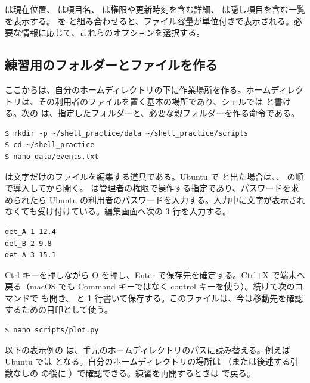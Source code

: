  は現在位置、 は項目名、 は権限や更新時刻を含む詳細、 は隠し項目を含む一覧を表示する。 を  と組み合わせると、ファイル容量が単位付きで表示される。必要な情報に応じて、これらのオプションを選択する。

\subsection{練習用のフォルダーとファイルを作る}

ここからは、自分のホームディレクトリの下に作業場所を作る。ホームディレクトリは、その利用者のファイルを置く基本の場所であり、シェルでは \code{\textasciitilde} と書ける。次の  は、指定したフォルダーと、必要な親フォルダーを作る命令である。

\begin{lstlisting}[numbers=none, xleftmargin=2\zw]
$ mkdir -p ~/shell_practice/data ~/shell_practice/scripts
$ cd ~/shell_practice
$ nano data/events.txt
\end{lstlisting}

 は文字だけのファイルを編集する道具である。Ubuntu で  と出た場合は、、 の順で導入してから開く。 は管理者の権限で操作する指定であり、パスワードを求められたら Ubuntu の利用者のパスワードを入力する。入力中に文字が表示されなくても受け付けている。編集画面へ次の 3 行を入力する。

\begin{lstlisting}[numbers=none, title={data/events.txt}]
det_A 1 12.4
det_B 2 9.8
det_A 3 15.1
\end{lstlisting}

Ctrl キーを押しながら O を押し、Enter で保存先を確定する。Ctrl+X で端末へ戻る（macOS でも Command キーではなく control キーを使う）。続けて次のコマンドで  も開き、 と 1 行書いて保存する。このファイルは、今は移動先を確認するための目印として使う。

\begin{lstlisting}[numbers=none, xleftmargin=2\zw]
$ nano scripts/plot.py
\end{lstlisting}

以下の表示例の  は、手元のホームディレクトリのパスに読み替える。例えば Ubuntu では  となる。自分のホームディレクトリの場所は （または後述する引数なしの  の後に ）で確認できる。練習を再開するときは  で戻る。


